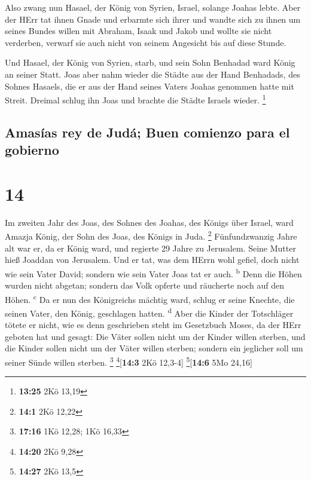  Also zwang nun Hasael, der König von Syrien, Israel,
solange Joahas lebte.  Aber der HErr tat ihnen Gnade und
erbarmte sich ihrer und wandte sich zu ihnen um seines Bundes willen mit
Abraham, Isaak und Jakob und wollte sie nicht verderben, verwarf sie
auch nicht von seinem Angesicht bis auf diese Stunde.

 Und Hasael, der König von Syrien, starb, und sein Sohn
Benhadad ward König an seiner Statt.  Joas aber nahm
wieder die Städte aus der Hand Benhadads, des Sohnes Hasaels, die er aus
der Hand seines Vaters Joahas genommen hatte mit Streit. Dreimal schlug
ihn Joas und brachte die Städte Israels wieder. \footnote{\textbf{13:25}
  2Kö 13,19}

\hypertarget{amasuxedas-rey-de-juduxe1-buen-comienzo-para-el-gobierno}{%
\subsection{Amasías rey de Judá; Buen comienzo para el
gobierno}\label{amasuxedas-rey-de-juduxe1-buen-comienzo-para-el-gobierno}}

\hypertarget{section-13}{%
\section{14}\label{section-13}}

 Im zweiten Jahr des Joas, des Sohnes des Joahas, des
Königs über Israel, ward Amazja König, der Sohn des Joas, des Königs in
Juda. \footnote{\textbf{14:1} 2Kö 12,22}  Fünfundzwanzig
Jahre alt war er, da er König ward, und regierte 29 Jahre zu Jerusalem.
Seine Mutter hieß Joaddan von Jerusalem.  Und er tat, was
dem HErrn wohl gefiel, doch nicht wie sein Vater David; sondern wie sein
Vater Joas tat er auch. \textsuperscript{b}  Denn die
Höhen wurden nicht abgetan; sondern das Volk opferte und räucherte noch
auf den Höhen. \textsuperscript{c}  Da er nun des
Königreichs mächtig ward, schlug er seine Knechte, die seinen Vater, den
König, geschlagen hatten. \textsuperscript{d}  Aber die
Kinder der Totschläger tötete er nicht, wie es denn geschrieben steht im
Gesetzbuch Moses, da der HErr geboten hat und gesagt: Die Väter sollen
nicht um der Kinder willen sterben, und die Kinder sollen nicht um der
Väter willen sterben; sondern ein jeglicher soll um seiner Sünde willen
sterben. \footnote{\textbf{17:16} 1Kö 12,28; 1Kö 16,33}
\footnote{\textbf{14:20} 2Kö 9,28}{[}\textbf{14:3} 2Kö 12,3-4{]}
\footnote{\textbf{14:27} 2Kö 13,5}{[}\textbf{14:6} 5Mo 24,16{]}

